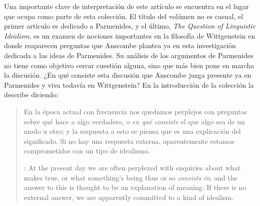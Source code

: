  Una importante clave de interpretación de este artículo se encuentra en el lugar que ocupa como parte de esta colección. El título del volúmen no es casual, el primer artículo es dedicado a Parmenides, y el último, \emph{The Question of Linguistic Idealism}, es un examen de nociones importantes en la filosofía de Wittgenstein en donde reaparecen preguntas que Anscombe plantea ya en esta investigación dedicada a las ideas de Parmenides. Su análisis de los argumentos de Parmenides no tiene como objetivo cerrar cuestión alguna, sino que más bien pone en marcha la discusión. ¿En qué consiste esta discusión que Anscombe juzga presente ya en Parmenides y viva todavía en Wittgenstein? En la introducción de la colección la describe diciendo: \blockquote[{\cite[xi]{anscombe1981parmenides}}: At the present day we are often perplexed with enquiries about what makes true, or what something's being thus or so \emph{consists in}; and the answer to this is thought to be an explanation of meaning. If there is no external answer, we are apparently committed to a kind of idealism.]{En la época actual con frecuencia nos quedamos perplejos con preguntas sobre qué hace a algo verdadero, o \emph{en qué consiste} el que algo sea de un modo u otro; y la respuesta a esto se piensa que es una explicación del significado. Si no hay una respuesta externa, aparentemente estamos comprometidos con un tipo de idealismo.}

